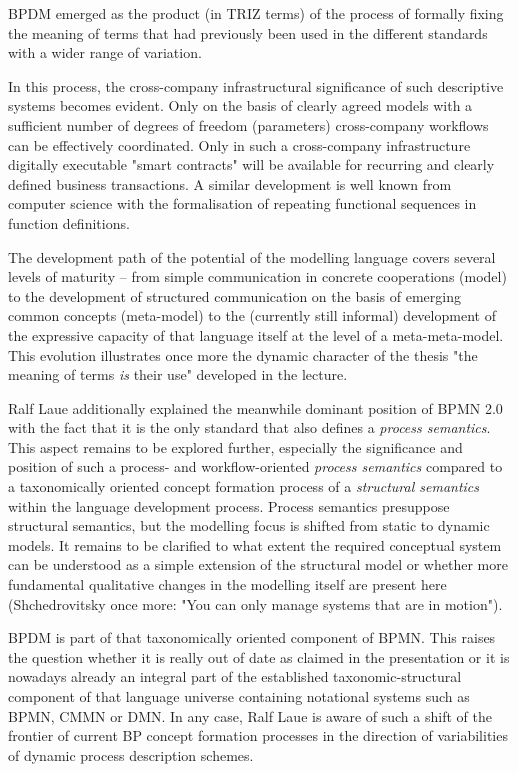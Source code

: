 \documentclass[11pt,a4paper]{article}
\begin{document}
BPDM emerged as the product (in TRIZ terms) of the process of formally fixing
the meaning of terms that had previously been used in the different standards
with a wider range of variation.

In this process, the cross-company infrastructural significance of such
descriptive systems becomes evident. Only on the basis of clearly agreed
models with a sufficient number of degrees of freedom (parameters)
cross-company workflows can be effectively coordinated. Only in such a
cross-company infrastructure digitally executable "smart contracts" will be
available for recurring and clearly defined business transactions. A similar
development is well known from computer science with the formalisation of
repeating functional sequences in function definitions.

The development path of the potential of the modelling language covers several
levels of maturity -- from simple communication in concrete cooperations
(model) to the development of structured communication on the basis of
emerging common concepts (meta-model) to the (currently still informal)
development of the expressive capacity of that language itself at the level of
a meta-meta-model. This evolution illustrates once more the dynamic character
of the thesis "the meaning of terms \emph{is} their use" developed in the
lecture.

Ralf Laue additionally explained the meanwhile dominant position of BPMN 2.0
with the fact that it is the only standard that also defines a \emph{process
  semantics}. This aspect remains to be explored further, especially the
significance and position of such a process- and workflow-oriented
\emph{process semantics} compared to a taxonomically oriented concept
formation process of a \emph{structural semantics} within the language
development process. Process semantics presuppose structural semantics, but
the modelling focus is shifted from static to dynamic models. It remains to be
clarified to what extent the required conceptual system can be understood as a
simple extension of the structural model or whether more fundamental
qualitative changes in the modelling itself are present here (Shchedrovitsky
once more: "You can only manage systems that are in motion").

BPDM is part of that taxonomically oriented component of BPMN. This raises the
question whether it is really out of date as claimed in the presentation or it
is nowadays already an integral part of the established taxonomic-structural
component of that language universe containing notational systems such as
BPMN, CMMN or DMN. In any case, Ralf Laue is aware of such a shift of the
frontier of current BP concept formation processes in the direction of
variabilities of dynamic process description schemes.
\end{document}
